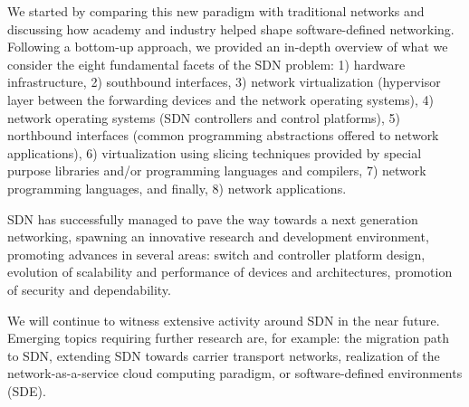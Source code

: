 We started by comparing this new paradigm with traditional networks
and discussing how academy and industry helped shape software-defined
networking.  Following a bottom-up approach, we provided an in-depth
overview of what we consider the eight fundamental facets of the SDN
problem: 1) hardware infrastructure, 2) southbound interfaces, 3)
network virtualization (hypervisor layer between the forwarding
devices and the network operating systems), 4) network operating
systems (SDN controllers and control platforms), 5) northbound
interfaces (common programming abstractions offered to network
applications), 6) virtualization using slicing techniques provided by
special purpose libraries and/or programming languages and compilers,
7) network programming languages, and finally, 8) network
applications.


SDN has successfully managed to pave the way towards a next generation networking, spawning an innovative research and development
environment, promoting advances in several areas: switch and
controller platform design, evolution of scalability and performance
of devices and architectures, promotion of security and dependability.

We will continue to witness extensive activity around SDN in the near
future. Emerging topics requiring further research are, for example:
the migration path to SDN, extending SDN towards carrier transport networks, realization of the
network-as-a-service cloud computing paradigm, or software-defined
environments (SDE).

